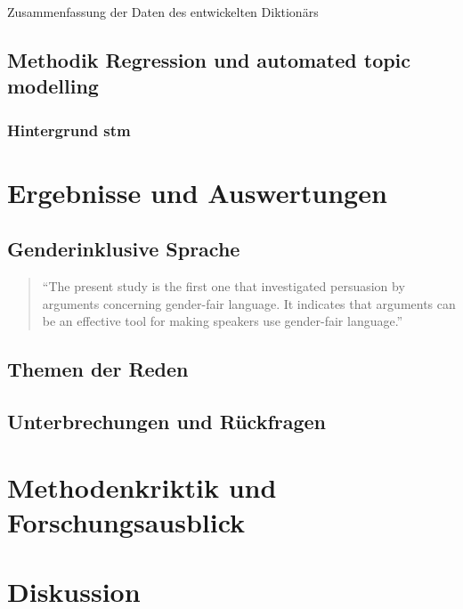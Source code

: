 \documentclass[12pt, 
    twoside=false, 
    bibliography=totoc, 
    numbers=endperiod, 
    headings=normal, 
    toc=chapterentrydotfill
    ]{scrbook}
\begin{document}
\begin{table}[htb]
    \centering
    \caption[Zusammenfassung der Daten des entwickelten Diktionärs]{Zusammenfassung der Daten des entwickelten Diktionärs}
    
    \label{table:zusammenfassung_dict}
\end{table}

\section{Methodik Regression und automated topic modelling}

\subsection{Hintergrund stm}

\chapter{Ergebnisse und Auswertungen}

\section{Genderinklusive Sprache}

\begin{quote}
    \enquote {The present study is the first one that investigated persuasion by arguments concerning gender-fair language. It indicates that arguments can be an effective tool for making speakers use gender-fair language.} \parencite[556]{koeser_2014}
\end{quote} 

\section{Themen der Reden}

\section{Unterbrechungen und Rückfragen}

\chapter{Methodenkriktik und Forschungsausblick}

\chapter{Diskussion}
\end{document}
